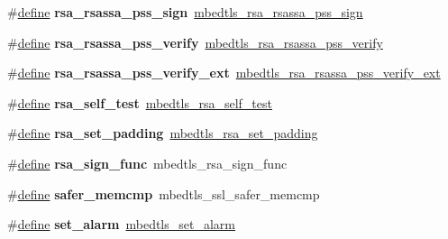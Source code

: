 \begin{DoxyCompactItemize}
\#\hyperlink{structdefine}{define} {\bfseries rsa\+\_\+rsassa\+\_\+pss\+\_\+sign}~\hyperlink{rsa_8h_aec5d149705050cd3839fe68e095e32b2}{mbedtls\+\_\+rsa\+\_\+rsassa\+\_\+pss\+\_\+sign}
\item 
\mbox{\label{compat-1_83_8h_a055e3d8b629d5576616fb9aa80d7050b}} 
\#\hyperlink{structdefine}{define} {\bfseries rsa\+\_\+rsassa\+\_\+pss\+\_\+verify}~\hyperlink{rsa_8h_a71b172ac54391d845ec163a20cbec09d}{mbedtls\+\_\+rsa\+\_\+rsassa\+\_\+pss\+\_\+verify}
\item 
\mbox{\label{compat-1_83_8h_ac7ab628877174c66dd5ea9d2e1b40486}} 
\#\hyperlink{structdefine}{define} {\bfseries rsa\+\_\+rsassa\+\_\+pss\+\_\+verify\+\_\+ext}~\hyperlink{rsa_8h_ac7791a1e03b00651a844dc6f5f32aaaa}{mbedtls\+\_\+rsa\+\_\+rsassa\+\_\+pss\+\_\+verify\+\_\+ext}
\item 
\mbox{\label{compat-1_83_8h_adb6cf5eb6d08a7f03f1b20f8744c6dee}} 
\#\hyperlink{structdefine}{define} {\bfseries rsa\+\_\+self\+\_\+test}~\hyperlink{rsa_8h_a1e5352f846fbb0938fb757be5cde0262}{mbedtls\+\_\+rsa\+\_\+self\+\_\+test}
\item 
\mbox{\label{compat-1_83_8h_a0871b413a7b07384f48fbbad37a90725}} 
\#\hyperlink{structdefine}{define} {\bfseries rsa\+\_\+set\+\_\+padding}~\hyperlink{rsa_8h_ad92c3d026f78e8cac7bac4bf94dc0562}{mbedtls\+\_\+rsa\+\_\+set\+\_\+padding}
\item 
\mbox{\label{compat-1_83_8h_a2548b1616f665afa27b5ad00841f8799}} 
\#\hyperlink{structdefine}{define} {\bfseries rsa\+\_\+sign\+\_\+func}~mbedtls\+\_\+rsa\+\_\+sign\+\_\+func
\item 
\mbox{\label{compat-1_83_8h_a4c53e54d0239c94880f7b739257de6ee}} 
\#\hyperlink{structdefine}{define} {\bfseries safer\+\_\+memcmp}~mbedtls\+\_\+ssl\+\_\+safer\+\_\+memcmp
\item 
\mbox{\label{compat-1_83_8h_ac75e2e74e971b37dd9c1cded94a1c4ff}} 
\#\hyperlink{structdefine}{define} {\bfseries set\+\_\+alarm}~\hyperlink{timing_8h_a7ea7574e836da0dc51b4b16c4033ede3}{mbedtls\+\_\+set\+\_\+alarm}
\item 
\mbox{\label{compat-1_83_8h_aa8fa98c9b77611a7e3c3dec20725badb}} 

\end{DoxyCompactItemize}
